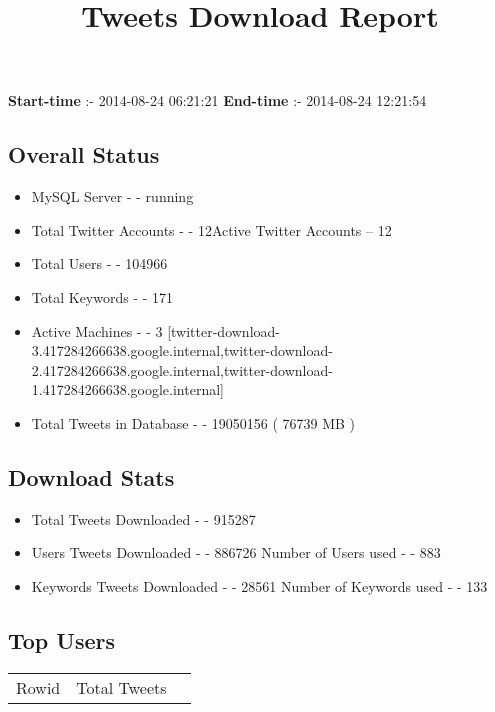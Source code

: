 \documentclass{article}\usepackage[T1]{fontenc}
\begin{document}
\title{\textbf{Tweets Download Report}}
               \date{}
                \maketitle
               \centerline{\textbf{Start-time} :- 2014-08-24 06:21:21 \hspace{40pt} \textbf{End-time} :- 2014-08-24 12:21:54}               \subsection*{Overall Status}                \begin{itemize}                \item MySQL Server - - running               \item Total Twitter Accounts - - 12\newline Active Twitter Accounts -- 12               \item Total Users - - 104966               \item Total Keywords - - 171               \item Active Machines - - 3 [twitter-download-3.417284266638.google.internal,twitter-download-2.417284266638.google.internal,twitter-download-1.417284266638.google.internal]               \item Total Tweets in Database - - 19050156 ( 76739 MB )               \end{itemize}               \subsection*{Download Stats}                \begin{itemize}                \item Total Tweets Downloaded - - 915287               \item Users Tweets Downloaded - - 886726 \newline Number of Users used - - 883               \item Keywords Tweets Downloaded - - 28561 \newline Number of Keywords used - - 133              \end{itemize}              \subsection*{Top Users}\begin{tabular}{|c|c|c|}         \hline         Rowid & Total Tweets \\ 

\end{tabular}
\end{document}
